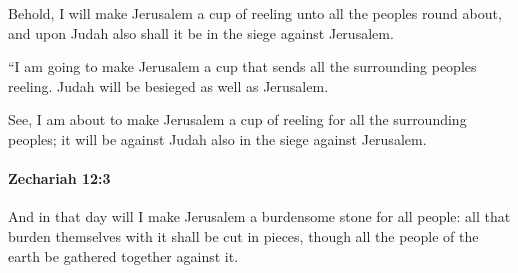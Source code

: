			\begin{versebox}
					\item[BHS] 
					\item[LXX] 
					\item[ASV] Behold, I will make Jerusalem a cup of reeling unto all the peoples round about, and upon Judah also shall it be in the siege against Jerusalem.
					\item[NIV] “I am going to make Jerusalem a cup that sends all the surrounding peoples reeling. Judah will be besieged as well as Jerusalem.
					\item[NRSV] See, I am about to make Jerusalem a cup of reeling for all the surrounding peoples; it will be against Judah also in the siege against Jerusalem.
			\end{versebox}

		\paragraph{Zechariah 12:3} %
			\label{ZECHARIAH-12-3}

			And in that day will I make Jerusalem a burdensome stone for all people: all that burden themselves with it shall be cut in pieces, though all the people of the earth be gathered together against it.

